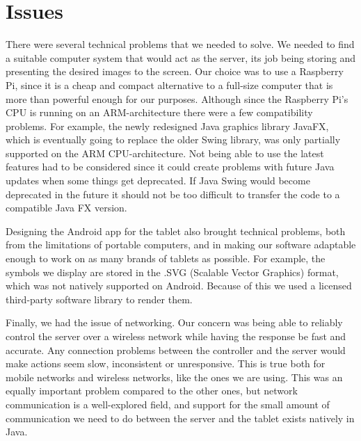 \documentclass[12pt,a4paper,notitlepage]{report}
\begin{document}


\section{Issues}
There were several technical problems that we needed to solve. We needed to find a suitable computer system that would act as the server, its job being storing and presenting the desired images to the screen. Our choice was to use a Raspberry Pi, since it is a cheap and compact alternative to a full-size computer that is more than powerful enough for our purposes. Although since the Raspberry Pi's CPU is running on an ARM-architecture there were a few compatibility problems. For example, the newly redesigned Java graphics library JavaFX, which is eventually going to replace the older Swing library, was only partially supported on the ARM CPU-architecture. Not being able to use the latest features had to be considered since it could create problems with future Java updates when some things get deprecated. If Java Swing would become deprecated in the future it should not be too difficult to transfer the code to a compatible Java FX version.

Designing the Android app for the tablet also brought technical problems, both from the limitations of portable computers, and in making our software adaptable enough to work on as many brands of tablets as possible. For example, the symbols we display are stored in the .SVG (Scalable Vector Graphics) format, which was not natively supported on Android. Because of this we used a licensed third-party software library to render them. 

Finally, we had the issue of networking. Our concern was being able to reliably control the server over a wireless network while having the response be fast and accurate. Any connection problems between the controller and the server would make actions seem slow, inconsistent or unresponsive. This is true both for mobile networks and wireless networks, like the ones we are using. This was an equally important problem compared to the other ones, but network communication is a well-explored field, and support for the small amount of communication we need to do between the server and the tablet exists natively in Java.
\end{document}
